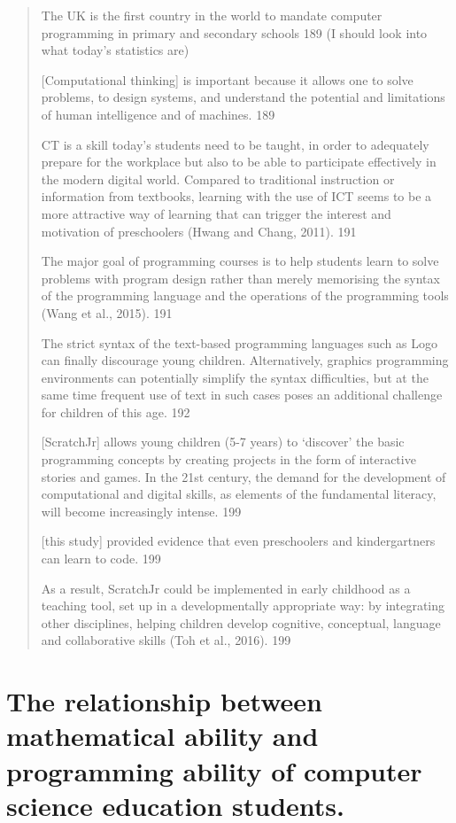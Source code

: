 \documentclass[12pt]{extarticle}
\begin{document}
{\begin{quote}
    The UK is the first country in the world to mandate computer programming in primary and secondary schools 	189 (I should look into what today’s statistics are)
    
    [Computational thinking] is important because it allows one to solve problems, to design systems, and understand the potential and limitations of human intelligence and of machines.	189
    
    CT is a skill today’s students need to be taught, in order to adequately prepare for the workplace but also to be able to participate effectively in the modern digital world. 
    Compared to traditional instruction or information from textbooks, learning with the use of ICT seems to be a more attractive way of learning that can trigger the interest and motivation of preschoolers (Hwang and Chang, 2011). 	191
    
    The major goal of programming courses is to help students learn to solve problems with program design rather than merely memorising the syntax of the programming language and the operations of the programming tools (Wang et al., 2015).	191
    
    The strict syntax of the text-based programming languages such as Logo can finally discourage young children. Alternatively, graphics programming environments can potentially simplify the syntax difficulties, but at the same time frequent use of text in such cases poses an additional challenge for children of this age. 	192
    
    [ScratchJr] allows young children (5-7 years) to ‘discover’ the basic programming concepts by creating projects in the form of interactive stories and games.
    In the 21st century, the demand for the development of computational and digital skills, as elements of the fundamental literacy, will become increasingly intense.	199
    
    [this study] provided evidence that even preschoolers and kindergartners can learn to code.	199
    
    As a result, ScratchJr could be implemented in early childhood as a teaching tool, set up in a developmentally appropriate way: by integrating other disciplines, helping children develop cognitive, conceptual, language and collaborative skills (Toh et al., 2016). 	199
\end{quote}


\section*{The relationship between mathematical ability and programming ability of computer science education students.}
}
\end{document}

